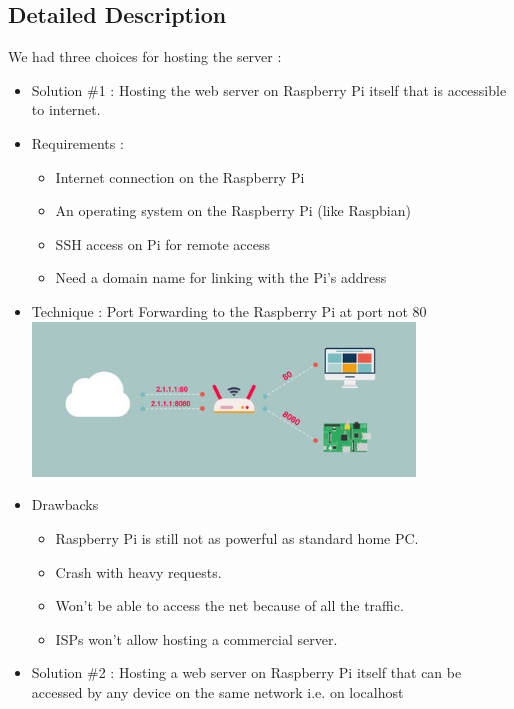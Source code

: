 \subsection{Detailed Description}
{\normalsize We had three choices for hosting the server : 
\begin{itemize}
    \item Solution \#1 : Hosting the web server on Raspberry Pi itself that is accessible to internet.
    \item Requirements :  
    \begin{itemize}
    \renewcommand{\labelitemi}{$\Rightarrow$}
    \item Internet connection on the Raspberry Pi
    \item An operating system on the Raspberry Pi (like Raspbian)
    \item SSH access on Pi for remote access
    \item Need a domain name for linking with the Pi’s address
    \end{itemize}
    
    \item Technique : Port Forwarding to the Raspberry Pi at port not 80 \\[0.1in]
    \includegraphics[width=0.8\textwidth]{2.jpg}
    \item Drawbacks
    \begin{itemize}
    \renewcommand{\labelitemi}{$\Rightarrow$}
    \item Raspberry Pi is still not as powerful as standard home PC.
    \item Crash with heavy requests.
    \item Won’t be able to access the net because of all the traffic.
    \item ISPs won’t allow hosting a commercial server.
    \end{itemize}
    
    \item Solution \#2 : Hosting a web server on Raspberry Pi itself that can be accessed by any device on the same network i.e. on localhost 


\end{itemize}}
